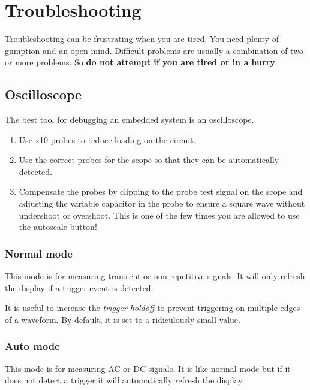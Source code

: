 \chapter{Troubleshooting}
\label{troubleshooting}

Troubleshooting can be frustrating when you are tired. You need plenty
of gumption and an open mind. Difficult problems are usually a
combination of two or more problems. So \textbf{do not attempt if you
are tired or in a hurry}.

\section{Oscilloscope}
\label{oscilloscope}

The best tool for debugging an embedded system is an oscilloscope.

\begin{enumerate}
\item
  Use x10 probes to reduce loading on the circuit.
\item
  Use the correct probes for the scope so that they can be automatically
  detected.
\item
  Compensate the probes by clipping to the probe test signal on the
  scope and adjusting the variable capacitor in the probe to ensure a
  square wave without undershoot or overshoot. This is one of the few
  times you are allowed to use the autoscale button!
\end{enumerate}

\subsection{Normal mode}
\label{normal-mode}

This mode is for measuring transient or non-repetitive signals. It will
only refresh the display if a trigger event is detected.

It is useful to increase the \emph{trigger holdoff} to prevent
triggering on multiple edges of a waveform.  By default, it is set to
a ridiculously small value.

\subsection{Auto mode}
\label{auto-mode}

This mode is for measuring AC or DC signals. It is like normal mode but
if it does not detect a trigger it will automatically refresh the
display.

